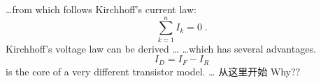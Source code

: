 \documentclass[11pt,twoside,a4paper]{article}
\begin{document}
\ldots from which follows Kirchhoff’s current law:
\begin{equation}
\sum_{k=1}^{n} I_k = 0 \; .
\end{equation}
Kirchhoff’s voltage law can be derived \ldots
\ldots which has several advantages.
\begin{equation}
I_D = I_F - I_R
\end{equation}
is the core of a very different transistor model. \ldots
从这里开始
Why??
\end{document}
